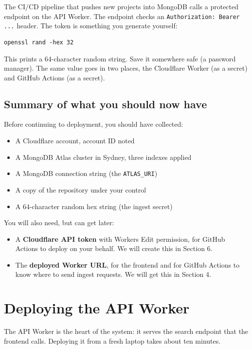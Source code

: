 \documentclass[11pt,a4paper]{article}
\begin{document}
The CI/CD pipeline that pushes new projects into MongoDB calls a protected endpoint on the API Worker. The endpoint checks an \texttt{Authorization: Bearer ...} header. The token is something you generate yourself:

\begin{lstlisting}[style=shell]
openssl rand -hex 32
\end{lstlisting}

This prints a 64-character random string. Save it somewhere safe (a password manager). The same value goes in two places, the Cloudflare Worker (as a secret) and GitHub Actions (as a secret).

\subsection{Summary of what you should now have}

Before continuing to deployment, you should have collected:

\begin{itemize}[leftmargin=1.5em,itemsep=2pt]
  \item A Cloudflare account, account ID noted
  \item A MongoDB Atlas cluster in Sydney, three indexes applied
  \item A MongoDB connection string (the \texttt{ATLAS\_URI})
  \item A copy of the repository under your control
  \item A 64-character random hex string (the ingest secret)
\end{itemize}

You will also need, but can get later:

\begin{itemize}[leftmargin=1.5em,itemsep=2pt]
  \item A \textbf{Cloudflare API token} with Workers Edit permission, for GitHub Actions to deploy on your behalf. We will create this in Section 6.
  \item The \textbf{deployed Worker URL}, for the frontend and for GitHub Actions to know where to send ingest requests. We will get this in Section 4.
\end{itemize}

\section{Deploying the API Worker}

The API Worker is the heart of the system: it serves the search endpoint that the frontend calls. Deploying it from a fresh laptop takes about ten minutes.
\end{document}
